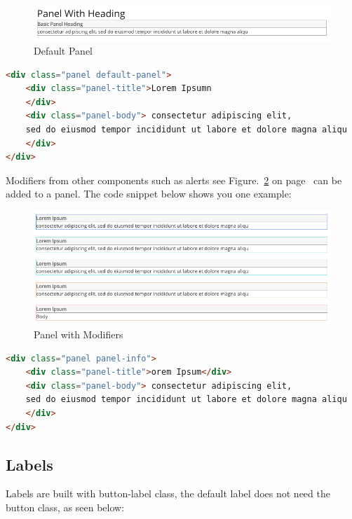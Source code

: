 \begin{figure}[h]
\centering
  \includegraphics[scale=0.28]{images/panel}
  \caption{Default Panel}
  \label{fig:panel}
\end{figure}


\begin{lstlisting}[language=HTML]
<div class="panel default-panel">
	<div class="panel-title">Lorem Ipsumn
	</div>
	<div class="panel-body"> consectetur adipiscing elit, 
	sed do eiusmod tempor incididunt ut labore et dolore magna aliqu
	</div>
</div>
\end{lstlisting}

Modifiers from other components such as alerts see Figure.~\ref{fig:panelmod} on  page~\pageref{fig:panelmod} can be added to a panel. The code snippet below shows you one example: 

\begin{figure}[h]
\centering
  \includegraphics[scale=0.27]{images/panelmod}
\caption{Panel with Modifiers}
  \label{fig:panelmod}
\end{figure}

\begin{lstlisting}[language=HTML]
<div class="panel panel-info">
	<div class="panel-title">orem Ipsum</div>
	<div class="panel-body"> consectetur adipiscing elit, 
	sed do eiusmod tempor incididunt ut labore et dolore magna aliqu
	</div>
</div>
\end{lstlisting}


\subsection*{Labels}

Labels are built with button-label class, the default label does not need the button class, as seen below: 

